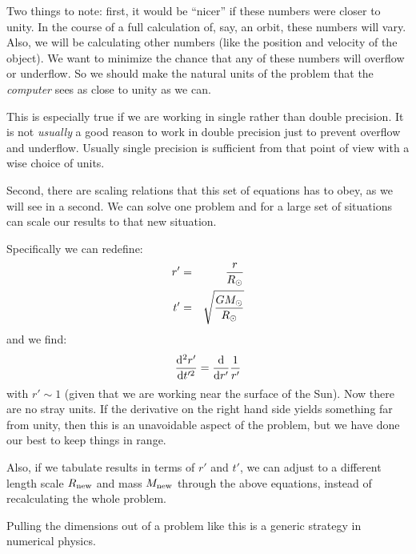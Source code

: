 Two things to note: first, it would be ``nicer'' if these numbers were
closer to unity. In the course of a full calculation of, say, an
orbit, these numbers will vary. Also, we will be calculating other
numbers (like the position and velocity of the object). We want to
minimize the chance that any of these numbers will overflow or
underflow. So we should make the natural units of the problem that the
{\it computer} sees as close to unity as we can.

This is especially true if we are working in single rather than double
precision. It is not {\it usually} a good reason to work in double
precision just to prevent overflow and underflow. Usually single
precision is sufficient from that point of view with a wise choice of
units.

Second, there are scaling relations that this set of equations has to
obey, as we will see in a second. We can solve one problem and for a
large set of situations can scale our results to that new situation.

Specifically we can redefine:
\begin{eqnarray}
r' &=& \frac{r}{R_\odot} \cr
t' &=& \sqrt{\frac{GM_\odot}{R_\odot}}
\end{eqnarray}
and we find:
\begin{equation}
\frac{{\rm d}^2r'}{{\rm d}t'^2} = 
\frac{{\rm d}}{{\rm d}r'} \frac{1}{r'}
\end{equation}
with $r' \sim 1$ (given that we are working near the surface of the
Sun). Now there are no stray units. If the derivative on the right
hand side yields something far from unity, then this is an unavoidable
aspect of the problem, but we have done our best to keep things in
range.

Also, if we tabulate results in terms of $r'$ and $t'$, we can adjust
to a different length scale $R_{\rm new}$ and mass $M_{\rm new}$
through the above equations, instead of recalculating the whole
problem.

Pulling the dimensions out of a problem like this is a generic
strategy in numerical physics.
